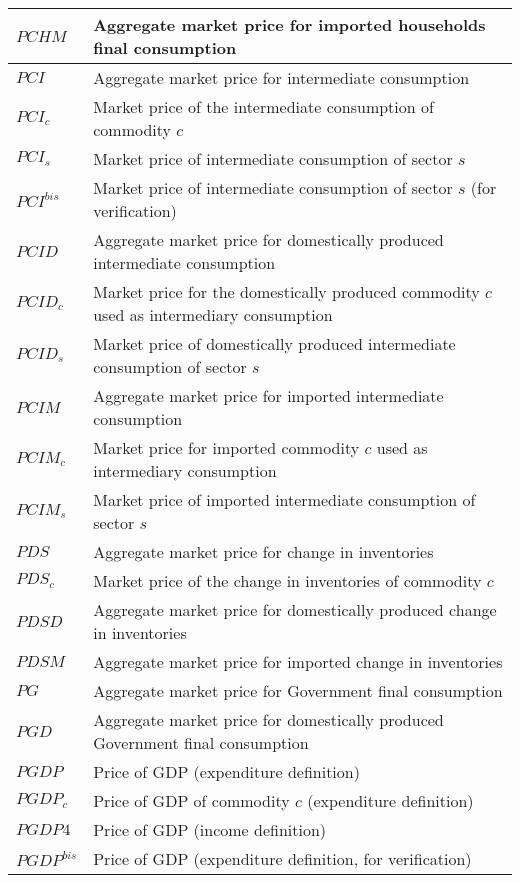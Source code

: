 \documentclass[12pt]{article}
\numberwithin{equation}{section}
\begin{document}
\begin{longtable}{@{}p{4cm}p{9cm}@{}}
 \midrule 
$PCHM$ & Aggregate market price for imported households final consumption \\
 \midrule 
$PCI$ & Aggregate market price for intermediate consumption \\
 \midrule 
$PCI_{c}$ & Market price of the intermediate consumption of commodity $c$ \\
 \midrule 
$PCI_{s}$ & Market price of intermediate consumption of sector $s$ \\
 \midrule 
$PCI^{bis}$ & Market price of intermediate consumption of sector $s$ (for verification) \\
 \midrule 
$PCID$ & Aggregate market price for domestically produced intermediate consumption \\
 \midrule 
$PCID_{c}$ & Market price for the domestically produced commodity $c$ used as intermediary consumption \\
 \midrule 
$PCID_{s}$ & Market price of domestically produced intermediate consumption of sector $s$ \\
 \midrule 
$PCIM$ & Aggregate market price for imported intermediate consumption \\
 \midrule 
$PCIM_{c}$ & Market price for imported commodity $c$ used as intermediary consumption \\
 \midrule 
$PCIM_{s}$ & Market price of imported intermediate consumption of sector $s$ \\
 \midrule 
$PDS$ & Aggregate market price for change in inventories \\
 \midrule 
$PDS_{c}$ & Market price of the change in inventories of commodity $c$ \\
 \midrule 
$PDSD$ & Aggregate market price for domestically produced change in inventories \\
 \midrule 
$PDSM$ & Aggregate market price for imported change in inventories \\
 \midrule 
$PG$ & Aggregate market price for Government final consumption \\
 \midrule 
$PGD$ & Aggregate market price for domestically produced Government final consumption \\
 \midrule 
$PGDP$ & Price of GDP (expenditure definition) \\
 \midrule 
$PGDP_{c}$ & Price of GDP of commodity $c$ (expenditure definition) \\
 \midrule 
$PGDP4$ & Price of GDP (income definition) \\
 \midrule 
$PGDP^{bis}$ & Price of GDP (expenditure definition, for verification) \\

\end{longtable}
\end{document}
